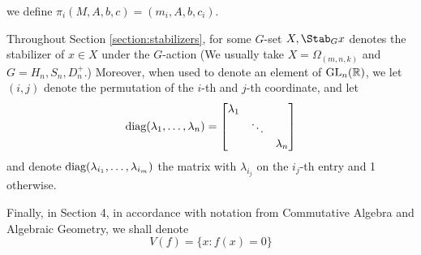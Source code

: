 \documentclass[11pt,letterpaper]{amsart}
\begin{document}
we define $\pi_i(M, A, b, c) = (m_i, A, b, c_i)$. 
\par Throughout Section \ref{section:stabilizers}, for some $G$-set $X, \Stab_G x$ denotes the stabilizer of $x\in X$ under the $G$-action (We usually take $X=\Omega_{(m,n,k)}$ and $G= H_n, S_n, D_n^+$.) Moreover, when used to denote an element of $\textup{GL}_n(\mathbb{R})$, we let $(i,j)$ denote the permutation of the $i$-th and $j$-th coordinate, and let
$$
\textup{diag}(\lambda_1, \ldots, \lambda_n) = \begin{bmatrix}
    \lambda_1 & & \\
    & \ddots & \\
    & & \lambda_n
\end{bmatrix}
$$
and denote $\textup{diag}(\lambda_{i_1}, \ldots, \lambda_{i_m})$ the matrix with $\lambda_{i_j}$ on the $i_j$-th entry and 1 otherwise. 
\par Finally, in Section 4, in accordance with notation from Commutative Algebra and Algebraic Geometry, we shall denote
$$
V(f) = \{x: f(x)=0\}
$$
\end{document}
